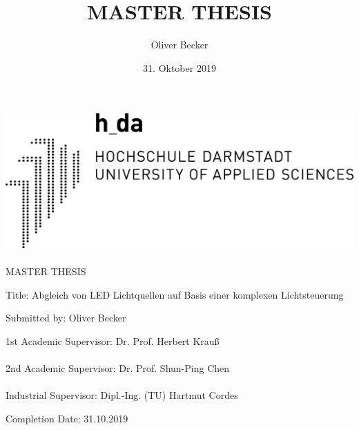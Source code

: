 \documentclass[11pt]{scrartcl}
\title{MASTER THESIS}
\author{Oliver Becker}
\date{31. Oktober 2019} %
\begin{document}
\begin{center}
    \center\includegraphics[width=0.4\linewidth]{images/logo.png}
    \paragraph{}
    \huge MASTER THESIS
\end{center}
\vspace{2cm}\noindent
{\large Title:  Abgleich von LED Lichtquellen auf Basis einer komplexen Lichtsteuerung}
\par\vspace{4cm}\noindent
Submitted by:   Oliver Becker\\
\par\vspace{2cm}\noindent
1st Academic Supervisor:    Dr. Prof. Herbert Krauß\\
\\
2nd Academic Supervisor:    Dr. Prof. Shun-Ping Chen\\
\\
Industrial Supervisor:      Dipl.-Ing. (TU) Hartmut Cordes\\
\par\vspace{2cm}\noindent
Completion Date:    31.10.2019
\clearpage

\tableofcontents
\clearpage
\end{document}
